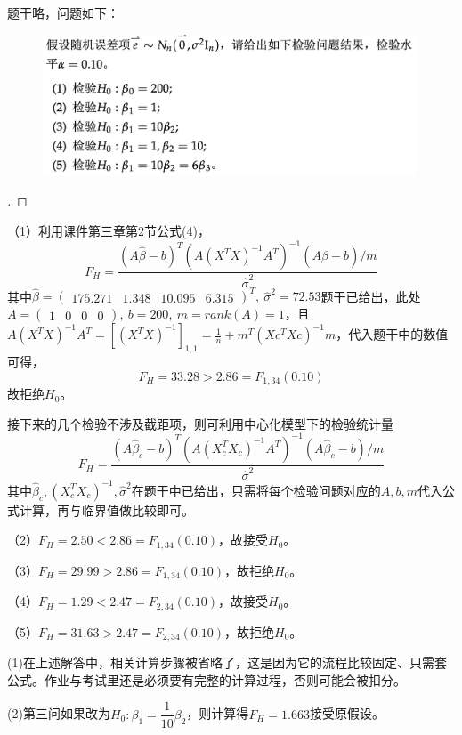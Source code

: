 \documentclass[cn,hazy,green,12pt,normal]{elegantnote}
\numberwithin{equation}{section}
\numberwithin{subsection}{section}
\begin{document}
\newpage

\begin{homework}
\end{homework}

题干略，问题如下：

    \begin{figure}[!htbp]
        \centering
        \includegraphics[width=30em]{image/hw4_plt6.png}
    \end{figure}

\begin{proof}[\solutionname]
\end{proof}

（1）利用课件第三章第2节公式(4)，
$$
F_H = \frac{(A \hat{\beta} - b)^T (A(X^T X)^{-1}A^T)^{-1} (A \hat{\beta} - b) / m}{\hat{\sigma}^2}
$$
其中$\hat{\beta} = 
\begin{pmatrix}
    175.271 & 1.348 & 10.095 & 6.315
\end{pmatrix}^T, \ \hat{\sigma}^2 = 72.53$题干已给出，此处$A = 
\begin{pmatrix}
    1 & 0 & 0 & 0
\end{pmatrix}, \ b = 200, \ m = rank(A) = 1$，且$A(X^T X)^{-1}A^T = [(X^T X)^{-1}]_{1,1} = \frac{1}{n} + m^T (Xc^TXc)^{-1} m$，代入题干中的数值可得，
$$
F_H = 33.28 > 2.86 = F_{1,34}(0.10)
$$
故拒绝$H_0$。

接下来的几个检验不涉及截距项，则可利用中心化模型下的检验统计量
$$
F_H = \frac{(A \hat{\beta}_c - b)^T (A(X_c^T X_c)^{-1}A^T)^{-1} (A \hat{\beta}_c - b) / m}{\hat{\sigma}^2}
$$
其中$\hat{\beta}_c, (X_c^T X_c)^{-1}, \hat{\sigma}^2$在题干中已给出，只需将每个检验问题对应的$A,b,m$代入公式计算，再与临界值做比较即可。

（2）$F_H = 2.50 < 2.86 = F_{1,34}(0.10)$，故接受$H_0$。

（3）$F_H = 29.99 > 2.86 = F_{1,34}(0.10)$，故拒绝$H_0$。

（4）$F_H = 1.29 < 2.47 = F_{2,34}(0.10)$，故接受$H_0$。

（5）$F_H = 31.63 > 2.47 = F_{2,34}(0.10)$，故拒绝$H_0$。

\begin{note}
    (1)在上述解答中，相关计算步骤被省略了，这是因为它的流程比较固定、只需套公式。作业与考试里还是必须要有完整的计算过程，否则可能会被扣分。

    \noindent (2)第三问如果改为$H_0: \beta_1=\dfrac{1}{10}\beta_2$，则计算得$F_H=1.663$接受原假设。
\end{note}
\end{document}
